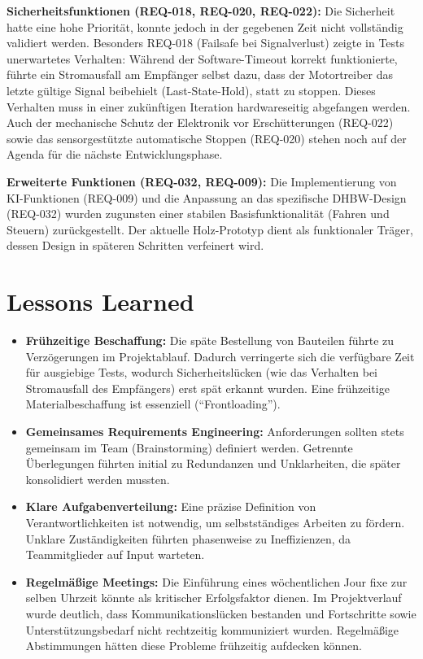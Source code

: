 \textbf{Sicherheitsfunktionen (REQ-018, REQ-020, REQ-022):} Die Sicherheit hatte eine hohe Priorität, konnte jedoch in der gegebenen Zeit nicht vollständig validiert werden. Besonders REQ-018 (Failsafe bei Signalverlust) zeigte in Tests unerwartetes Verhalten: Während der Software-Timeout korrekt funktionierte, führte ein Stromausfall am Empfänger selbst dazu, dass der Motortreiber das letzte gültige Signal beibehielt (Last-State-Hold), statt zu stoppen. Dieses Verhalten muss in einer zukünftigen Iteration hardwareseitig abgefangen werden. Auch der mechanische Schutz der Elektronik vor Erschütterungen (REQ-022) sowie das sensorgestützte automatische Stoppen (REQ-020) stehen noch auf der Agenda für die nächste Entwicklungsphase.

\textbf{Erweiterte Funktionen (REQ-032, REQ-009):} Die Implementierung von KI-Funktionen (REQ-009) und die Anpassung an das spezifische DHBW-Design (REQ-032) wurden zugunsten einer stabilen Basisfunktionalität (Fahren und Steuern) zurückgestellt. Der aktuelle Holz-Prototyp dient als funktionaler Träger, dessen Design in späteren Schritten verfeinert wird.

\section{Lessons Learned}
\label{cha:Lessons Learned}

\begin{itemize}
	\item \textbf{Frühzeitige Beschaffung:} Die späte Bestellung von Bauteilen führte zu Verzögerungen im Projektablauf. Dadurch verringerte sich die verfügbare Zeit für ausgiebige Tests, wodurch Sicherheitslücken (wie das Verhalten bei Stromausfall des Empfängers) erst spät erkannt wurden. Eine frühzeitige Materialbeschaffung ist essenziell ("`Frontloading"').
	
	\item \textbf{Gemeinsames Requirements Engineering:} Anforderungen sollten stets gemeinsam im Team (Brainstorming) definiert werden. Getrennte Überlegungen führten initial zu Redundanzen und Unklarheiten, die später konsolidiert werden mussten.
	
	\item \textbf{Klare Aufgabenverteilung:} Eine präzise Definition von Verantwortlichkeiten ist notwendig, um selbstständiges Arbeiten zu fördern. Unklare Zuständigkeiten führten phasenweise zu Ineffizienzen, da Teammitglieder auf Input warteten.
	
	\item \textbf{Regelmäßige Meetings:} Die Einführung eines wöchentlichen Jour fixe zur selben Uhrzeit könnte als kritischer Erfolgsfaktor dienen. Im Projektverlauf wurde deutlich, dass Kommunikationslücken bestanden und Fortschritte sowie Unterstützungsbedarf nicht rechtzeitig kommuniziert wurden. Regelmäßige Abstimmungen hätten diese Probleme frühzeitig aufdecken können.
\end{itemize}

